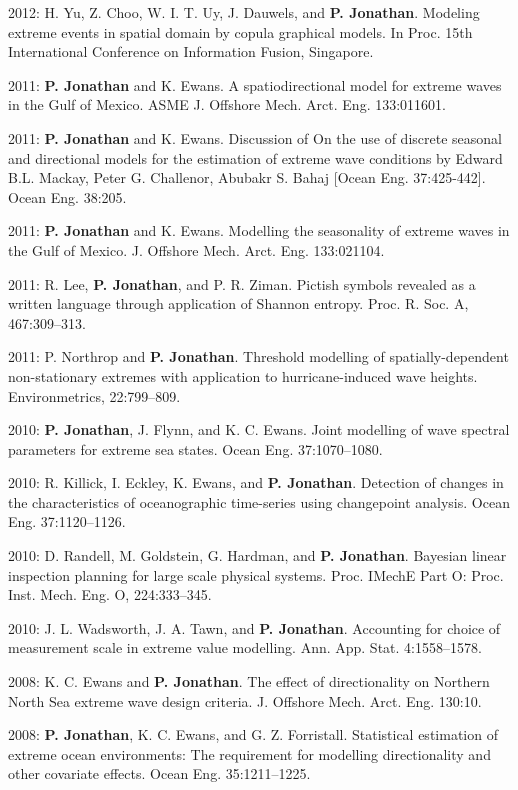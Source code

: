 \documentclass[11pt,a4paper]{moderncv}
\begin{document}
2012: H. Yu, Z. Choo, W. I. T. Uy, J. Dauwels, and \textbf{P. Jonathan}. Modeling extreme events in spatial domain by copula graphical models. In Proc. 15th International Conference on Information Fusion, Singapore.

2011: \textbf{P. Jonathan} and K. Ewans. A spatiodirectional model for extreme waves in the Gulf of Mexico. ASME J. Offshore Mech. Arct. Eng. 133:011601.

2011: \textbf{P. Jonathan} and K. Ewans. Discussion of On the use of discrete seasonal and directional models for the estimation of extreme wave conditions by Edward B.L. Mackay, Peter G. Challenor, Abubakr S. Bahaj [Ocean Eng. 37:425-442]. Ocean Eng. 38:205.

2011: \textbf{P. Jonathan} and K. Ewans. Modelling the seasonality of extreme waves in the Gulf of Mexico. J. Offshore Mech. Arct. Eng. 133:021104.

2011: R. Lee, \textbf{P. Jonathan}, and P. R. Ziman. Pictish symbols revealed as a written language through application of Shannon entropy. Proc. R. Soc. A, 467:309--313.

2011: P. Northrop and \textbf{P. Jonathan}. Threshold modelling of spatially-dependent non-stationary extremes with application to hurricane-induced wave heights. Environmetrics, 22:799--809.

2010: \textbf{P. Jonathan}, J. Flynn, and K. C. Ewans. Joint modelling of wave spectral parameters for extreme sea states. Ocean Eng. 37:1070--1080.

2010: R. Killick, I. Eckley, K. Ewans, and \textbf{P. Jonathan}. Detection of changes in the characteristics of oceanographic time-series using changepoint analysis. Ocean Eng. 37:1120--1126.

2010: D. Randell, M. Goldstein, G. Hardman, and \textbf{P. Jonathan}. Bayesian linear inspection planning for large scale physical systems. Proc. IMechE Part O: Proc. Inst. Mech. Eng. O, 224:333--345.

2010: J. L. Wadsworth, J. A. Tawn, and \textbf{P. Jonathan}. Accounting for choice of measurement scale in extreme value modelling. Ann. App. Stat. 4:1558--1578.

2008: K. C. Ewans and \textbf{P. Jonathan}. The effect of directionality on Northern North Sea extreme wave design criteria. J. Offshore Mech. Arct. Eng. 130:10.

2008: \textbf{P. Jonathan}, K. C. Ewans, and G. Z. Forristall. Statistical estimation of extreme ocean environments: The requirement for modelling directionality and other covariate effects. Ocean Eng. 35:1211--1225.
\end{document}
